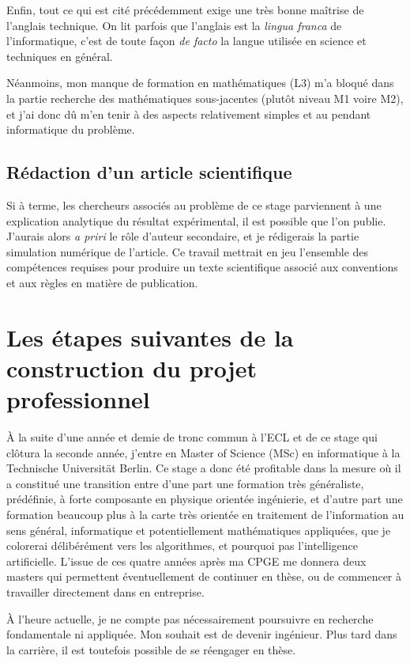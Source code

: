 \documentclass[svgnames,dvipsnames,a4paper,10pt,french]{report}
\begin{document}
Enfin, tout ce qui est cité précédemment exige une très bonne maîtrise de l'anglais technique. On lit parfois que l'anglais est la \textit{lingua franca} de l'informatique, c'est de toute façon \textit{de facto} la langue utilisée en science et techniques en général. 

Néanmoins, mon manque de formation en mathématiques (L3) m'a bloqué dans la partie recherche des mathématiques sous-jacentes (plutôt niveau M1 voire M2), et j'ai donc dû m'en tenir à des aspects relativement simples et au pendant informatique du problème.


\subsection{Rédaction d'un article scientifique}
Si à terme, les chercheurs associés au problème de ce stage parviennent à une explication analytique du résultat expérimental, il est possible que l'on publie. J'aurais alors \textit{a priri} le rôle d'auteur secondaire, et je rédigerais la partie simulation numérique de l'article. Ce travail mettrait en jeu l'ensemble des compétences requises pour produire un texte scientifique associé aux conventions et aux règles en matière de publication.

\section{Les étapes suivantes de la construction du projet professionnel}

À la suite d'une année et demie de tronc commun à l'ECL et de ce stage qui clôtura la seconde année, j'entre en Master of Science (MSc) en informatique à la Technische Universität Berlin. Ce stage a donc été profitable dans la mesure où il a constitué une transition entre d'une part une formation très généraliste, prédéfinie, à forte composante en physique orientée ingénierie, et d'autre part une formation beaucoup plus à la carte très orientée en traitement de l'information au sens général, informatique et potentiellement mathématiques appliquées, que je colorerai délibérément vers les algorithmes, et pourquoi pas l'intelligence artificielle. L'issue de ces quatre années après ma CPGE me donnera deux masters qui permettent éventuellement de continuer en thèse, ou de commencer à travailler directement dans en entreprise.


À l'heure actuelle, je ne compte pas nécessairement poursuivre en recherche fondamentale ni appliquée. Mon souhait est de devenir ingénieur. Plus tard dans la carrière, il est toutefois possible de se réengager en thèse.
 
\end{document}
